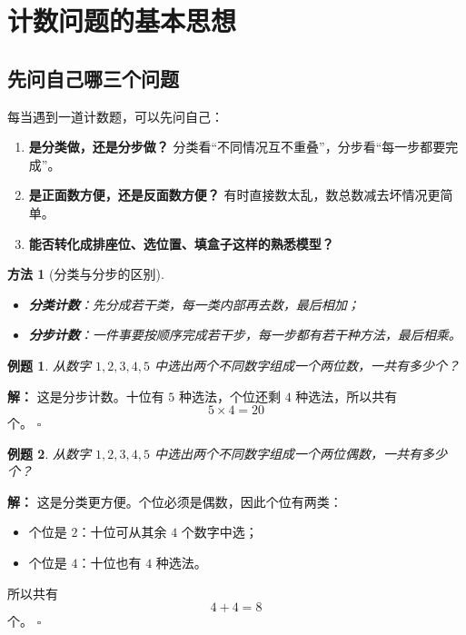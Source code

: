 \documentclass[11pt,a4paper,fontset=fandol]{ctexart}
\theoremstyle{formaltheorem}
\newtheorem{method}{方法}[section]
\theoremstyle{formalexample}
\newtheorem{example}{例题}[section]
\newenvironment{solution}{\par\noindent\textbf{解：}}{\hfill$\square$\par}
\begin{document}
\section{计数问题的基本思想}

\subsection{先问自己哪三个问题}
每当遇到一道计数题，可以先问自己：
\begin{enumerate}
  \item \textbf{是分类做，还是分步做？} 分类看“不同情况互不重叠”，分步看“每一步都要完成”。
  \item \textbf{是正面数方便，还是反面数方便？} 有时直接数太乱，数总数减去坏情况更简单。
  \item \textbf{能否转化成排座位、选位置、填盒子这样的熟悉模型？}
\end{enumerate}

\begin{method}[分类与分步的区别]
\begin{itemize}
  \item \textbf{分类计数}：先分成若干类，每一类内部再去数，最后相加；
  \item \textbf{分步计数}：一件事要按顺序完成若干步，每一步都有若干种方法，最后相乘。
\end{itemize}
\end{method}

\begin{example}
从数字 $1,2,3,4,5$ 中选出两个不同数字组成一个两位数，一共有多少个？
\end{example}

\begin{solution}
这是分步计数。十位有 $5$ 种选法，个位还剩 $4$ 种选法，所以共有
\[
5\times 4=20
\]
个。
\end{solution}

\begin{example}
从数字 $1,2,3,4,5$ 中选出两个不同数字组成一个两位偶数，一共有多少个？
\end{example}

\begin{solution}
这是分类更方便。个位必须是偶数，因此个位有两类：
\begin{itemize}
  \item 个位是 $2$：十位可从其余 $4$ 个数字中选；
  \item 个位是 $4$：十位也有 $4$ 种选法。
\end{itemize}
所以共有
\[
4+4=8
\]
个。
\end{solution}
\end{document}
